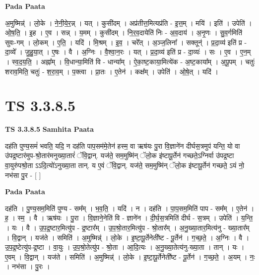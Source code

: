 \documentclass[17pt]{extarticle}
\begin{document}
\textbf{Pada Paata} \newline

अ॒मुष्मिन्न्॑ । लो॒के । ने॒नी॒ये॒र॒न्न् । यत् । कुसी॑दम् । अप्र॑तीत्त॒मित्यप्र॑ति - इ॒त्त॒म् । मयि॑ । इति॑ । उपेति॑ । ओ॒ष॒ति॒ । इ॒ह । ए॒व । सन्न् । य॒मम् । कुसी॑दम् । नि॒र॒व॒दायेति॑ निः - अ॒व॒दाय॑ । अ॒नृ॒णः । सु॒व॒र्गमिति॑ सुवः-गम् । लो॒कम् । ए॒ति॒ । यदि॑ । मि॒श्रम् । इ॒व॒ । चरे᳚त् । अ॒ञ्ज॒लिना᳚ । सक्तून्॑ । प्र॒दा॒व्य॑ इति॑ प्र - दा॒व्ये᳚ । जु॒हु॒या॒त् । ए॒षः । वै । अ॒ग्निः । वै॒श्वा॒न॒रः । यत् । प्र॒दा॒व्य॑ इति॑ प्र - दा॒व्यः॑ । सः । ए॒व । ए॒न॒म् । स्व॒द॒य॒ति॒ । अह्ना᳚म् । वि॒धान्या॒मिति॑ वि - धान्या᳚म् । ऐ॒का॒ष्ट॒काया॒मित्ये॑क - अ॒ष्ट॒काया᳚म् । अ॒पू॒पम् । चतुः॑ शराव॒मिति॒ चतुः॑ - श॒रा॒व॒म् । प॒क्त्वा । प्रा॒तः । ए॒तेन॑ । कक्ष᳚म् । उपेति॑ । ओ॒षे॒त् । यदि॑ ।  \newline




\section*{ TS 3.3.8.5 }

\textbf{TS 3.3.8.5 } \newline
\textbf{Samhita Paata} \newline

दह॑ति पुण्य॒समं॑ भवति॒ यदि॒ न दह॑ति पाप॒सम॑मे॒तेन॑ हस्म॒ वा ऋष॑यः पु॒रा वि॒ज्ञाने॑न दीर्घस॒त्रमुप॑ यन्ति॒ यो वा उ॑पद्र॒ष्टार॑मुप-श्रो॒तार॑मनुख्या॒तारं॑ ॅवि॒द्वान्. यज॑ते॒ सम॒मुष्मि॑न् ॅलो॒क इ॑ष्टापू॒र्तेन॑ गच्छते॒ऽग्निर्वा उ॑पद्र॒ष्टा वा॒युरु॑पश्रो॒ता ऽऽदि॒त्यो॑ऽनुख्या॒ता तान्. य ए॒वं ॅवि॒द्वान्. यज॑ते॒ सम॒मुष्मि॑न् ॅलो॒क इ॑ष्टापू॒र्तेन॑ गच्छते॒ ऽयं नो॒ नभ॑सा पु॒र - [  ] \newline

\textbf{Pada Paata} \newline

दह॑ति । पु॒ण्य॒सम॒मिति॑ पुण्य - सम᳚म् । भ॒व॒ति॒ । यदि॑ । न । दह॑ति । पा॒प॒सम॒मिति॑ पाप - सम᳚म् । ए॒तेन॑ । ह॒ । स्म॒ । वै । ऋष॑यः । पु॒रा । वि॒ज्ञाने॒नेति॑ वि - ज्ञाने॑न । दी॒र्घ॒स॒त्रमिति॑ दीर्घ - स॒त्रम् । उपेति॑ । य॒न्ति॒ । यः । वै । उ॒प॒द्र॒ष्टार॒मित्यु॑प - द्र॒ष्टार᳚म् । उ॒प॒श्रो॒तार॒मित्यु॑प - श्रो॒तार᳚म् । अ॒नु॒ख्या॒तार॒मित्य॑नु - ख्या॒तार᳚म् । वि॒द्वान् । यज॑ते । समिति॑ । अ॒मुष्मिन्न्॑ । लो॒के । इ॒ष्टा॒पू॒र्तेनेती᳚ष्ट - पू॒र्तेन॑ । ग॒च्छ॒ते॒ । अ॒ग्निः । वै । उ॒प॒द्र॒ष्टेत्यु॑प-द्र॒ष्टा । वा॒युः । उ॒प॒श्रो॒तेत्यु॑प - श्रो॒ता । आ॒दि॒त्यः । अ॒नु॒ख्या॒तेत्य॑नु-ख्या॒ता । तान् । यः । ए॒वम् । वि॒द्वान् । यज॑ते । समिति॑ । अ॒मुष्मिन्न्॑ । लो॒के । इ॒ष्टा॒पू॒र्तेनेती᳚ष्ट - पू॒र्तेन॑ । ग॒च्छ॒ते॒ । अ॒यम् । नः॒ । नभ॑सा । पु॒रः ।  \newline
\end{document}
